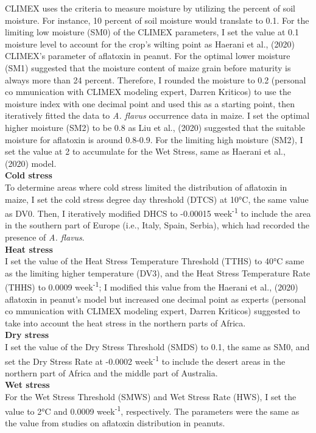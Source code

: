 CLIMEX uses the criteria to measure moisture by utilizing the percent of soil moisture. For instance, 10 percent of soil moisture would translate to 0.1. For the limiting low moisture (SM0) of the CLIMEX parameters, I set the value at 0.1 moisture level to account for the crop's wilting point as Haerani et al., (2020) CLIMEX's parameter of aflatoxin in peanut. For the optimal lower moisture (SM1) \citep{payne1983effect} suggested that the moisture content of maize grain before maturity is always more than 24 percent. Therefore, I rounded the moisture to 0.2 (personal co mmunication with CLIMEX modeling expert, Darren Kriticos) to use the moisture index with one decimal point and used this as a starting point, then iteratively fitted the data to \textit{A. flavus}  occurrence data in maize. I set the optimal higher moisture (SM2) to be 0.8 as Liu et al., (2020) suggested that the suitable moisture for aflatoxin is around 0.8-0.9. For the limiting high moisture (SM2), I set the value at 2 to accumulate for the Wet Stress, same as Haerani et al., (2020) model.
\vspace{\baselineskip} \\
\textbf{Cold stress}
\\
To determine areas where cold stress limited the distribution of aflatoxin in maize, I set the cold stress degree day threshold (DTCS) at 10°C, the same value as DV0. Then, I iteratively modified DHCS to -0.00015 week\textsuperscript{-1} to include the area in the southern part of Europe (i.e., Italy, Spain, Serbia), which had recorded the presence of \textit{A. flavus}.  
\vspace{\baselineskip}  \\
\textbf{Heat stress}
\\
I set the value of the Heat Stress Temperature Threshold (TTHS) to 40°C same as the limiting higher temperature (DV3), and the Heat Stress Temperature Rate (THHS) to 0.0009 week\textsuperscript{-1}; I modified this value from the Haerani et al., (2020) aflatoxin in peanut's model but increased one decimal point as experts  (personal co mmunication with CLIMEX modeling expert, Darren Kriticos) suggested to take into account the heat stress in the northern parts of Africa. 
\vspace{\baselineskip} \\
\textbf{Dry stress} 
\\
I set the value of the Dry Stress Threshold (SMDS) to 0.1, the same as SM0, and set the Dry Stress Rate at -0.0002 week\textsuperscript{-1} to include the desert areas in the northern part of Africa and the middle part of Australia. 
\vspace{\baselineskip} \\
\textbf{Wet stress}
\\
For the Wet Stress Threshold (SMWS) and Wet Stress Rate (HWS), I set the value to 2°C and 0.0009 week\textsuperscript{-1}, respectively. The parameters were the same as the value from \citep{haerani2020climate} studies on aflatoxin distribution in peanuts. 


